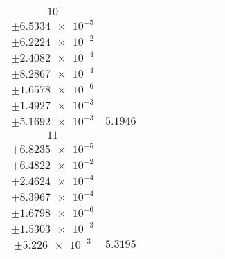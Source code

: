 \documentclass[8pt]{article}
\begin{document}
\begin{longtable}[l]{c c c c c c c c c}
$\num{10}$ & \begin{tabular}[c]{@{}c@{}}$\num{6.0869e-2}$ \\ $\pm\num{6.5334e-5}$\end{tabular} & \begin{tabular}[c]{@{}c@{}}$\num{-3.3724e-2}$ \\ $\pm\num{6.2224e-2}$\end{tabular} & \begin{tabular}[c]{@{}c@{}}$\num{-3.3751}$ \\ $\pm\num{2.4082e-4}$\end{tabular} & \begin{tabular}[c]{@{}c@{}}$\num{1.9776e+3}$ \\ $\pm\num{8.2867e-4}$\end{tabular} & \begin{tabular}[c]{@{}c@{}}$\num{3.9563}$ \\ $\pm\num{1.6578e-6}$\end{tabular} & \begin{tabular}[c]{@{}c@{}}$\num{1.1616}$ \\ $\pm\num{1.4927e-3}$\end{tabular} & \begin{tabular}[c]{@{}c@{}}$\num{4.2251}$ \\ $\pm\num{5.1692e-3}$\end{tabular} & $\num{5.1946}$\\
$\num{11}$ & \begin{tabular}[c]{@{}c@{}}$\num{6.0867e-2}$ \\ $\pm\num{6.8235e-5}$\end{tabular} & \begin{tabular}[c]{@{}c@{}}$\num{-0.12115}$ \\ $\pm\num{6.4822e-2}$\end{tabular} & \begin{tabular}[c]{@{}c@{}}$\num{-0.95458}$ \\ $\pm\num{2.4624e-4}$\end{tabular} & \begin{tabular}[c]{@{}c@{}}$\num{1.98e+3}$ \\ $\pm\num{8.3967e-4}$\end{tabular} & \begin{tabular}[c]{@{}c@{}}$\num{3.9611}$ \\ $\pm\num{1.6798e-6}$\end{tabular} & \begin{tabular}[c]{@{}c@{}}$\num{1.1666}$ \\ $\pm\num{1.5303e-3}$\end{tabular} & \begin{tabular}[c]{@{}c@{}}$\num{4.2276}$ \\ $\pm\num{5.226e-3}$\end{tabular} & $\num{5.3195}$\\

\end{longtable}
\end{document}
